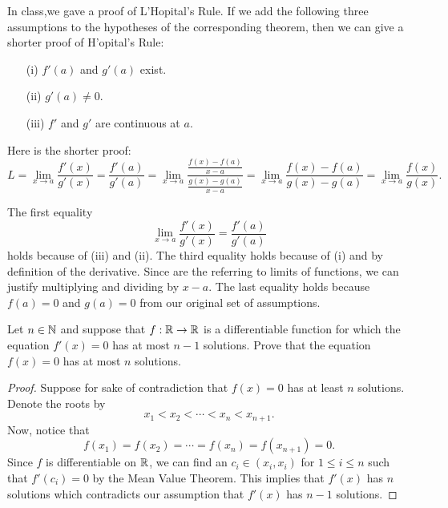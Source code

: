 \documentclass[a4paper]{article}
\begin{document}
\begin{problem}
    In class,we gave a proof of L'Hopital's Rule. If we add the following three assumptions to the hypotheses of the corresponding theorem, then we can give a shorter proof of H'opital's Rule:
    \begin{enumerate}
        \item[(i)] \( f'(a) \) and \( g'(a) \) exist. 
        \item[(ii)] \( g'(a) \neq 0 \).
        \item[(iii)] \( f' \) and \( g' \) are continuous at \( a  \).
    \end{enumerate}
    Here is the shorter proof:
    \[  L = \lim_{ x \to a }  \frac{ f'(x) }{ g'(x) }  = \frac{ f'(a) }{ g'(a) } = \lim_{ x \to a }  \frac{ \frac{ f(x) - f(a) }{ x - a  }  }{  \frac{ g(x) - g(a) }{ x - a  }  } = \lim_{ x \to a }  \frac{ f(x) - f(a) }{  g(x) - g(a) }  = \lim_{ x \to a }  \frac{ f(x)  }{  g(x) }.  \]
\end{problem}
\begin{solution}
    The first equality
    \[  \lim_{ x \to a }  \frac{ f'(x) }{ g'(x) }  = \frac{ f'(a) }{  g'(a) } \]
    holds because of (iii) and (ii). The third equality holds because of (i) and by definition of the derivative. Since are the referring to limits of functions, we can justify multiplying and dividing by \( x - a  \). The last equality holds because \( f(a) = 0  \) and \( g(a) = 0  \) from our original set of assumptions.
\end{solution}

\begin{problem}
    Let \( n \in \mathbb{N}  \) and suppose that \( f : \mathbb{R} \to \mathbb{R}  \) is a differentiable function for which the equation \( f'(x) = 0  \) has at most \( n - 1  \) solutions. Prove that the equation \( f(x) = 0  \) has at most \( n  \) solutions.
\end{problem}
\begin{proof}
Suppose for sake of contradiction that \( f(x) = 0  \) has at least \( n \) solutions. Denote the roots by
\[  {x}_{1} < {x}_{2} < \cdots < {x}_{n} < {x}_{n+1}. \]
Now, notice that 
\[  f({x}_{1}) = f({x}_{2}) = \cdots = f({x}_{n}) = f({x}_{n+1}) = 0.  \]
Since \( f  \) is differentiable on \( \mathbb{R}  \), we can find an \( {c}_{i} \in ({x}_{i}, {x}_{i} ) \) for \( 1 \leq i \leq n  \) such that \( f'({c}_{i}) = 0  \) by the Mean Value Theorem. This implies that \( f'(x) \) has \( n  \) solutions which contradicts our assumption that \( f'(x)  \) has \( n - 1  \) solutions.
\end{proof}
\end{document}
